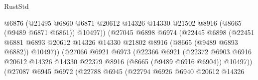 \begin{lexlean}{RustStd}
\begin{coremodule}
                                        @6876
                                        (@21495
                                          @6860
                                          @6871
                                          @20612
                                          @14326
                                          @14330
                                          @21502
                                          @8916
                                          (@8665 (@9489 @6871 @6861))
                                          @10497))
                                      (@27045
                                        @6898
                                        @6974
                                        (@22445
                                          @6898
                                          (@22451
                                            @6881
                                            @6893
                                            @20612
                                            @14326
                                            @14330
                                            @21802
                                            @8916
                                            (@8665 (@9489 @6893 @6882))
                                            @10497))
                                        (@27066
                                          @6921
                                          @6973
                                          (@22366
                                            @6921
                                            (@22372
                                              @6903
                                              @6916
                                              @20612
                                              @14326
                                              @14330
                                              @22379
                                              @8916
                                              (@8665 (@9489 @6916 @6904))
                                              @10497))
                                          (@27087
                                            @6945
                                            @6972
                                            (@22788
                                              @6945
                                              (@22794
                                                @6926
                                                @6940
                                                @20612
                                                @14326

\end{coremodule}
\end{lexlean}
